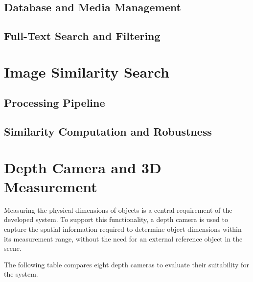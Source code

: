 \subsection{Database and Media Management}\label{sec:implementation:storage:database}

\subsection{Full-Text Search and Filtering}\label{sec:implementation:storage:search}

\section{Image Similarity Search}\label{sec:implementation:similarity}

\subsection{Processing Pipeline}\label{sec:implementation:similarity:pipeline}

\subsection{Similarity Computation and Robustness}\label{sec:implementation:similarity:robustness}
\setauthor{\firstauthor}
\section{Depth Camera and 3D Measurement}
\label{sec:implementation:camera}

Measuring the physical dimensions of objects is a central requirement of the developed system. To support this functionality, a depth camera is used to capture the spatial information required to determine object dimensions within its measurement range, without the need for an external reference object in the scene.

The following table compares eight depth cameras to evaluate their suitability for the system.

